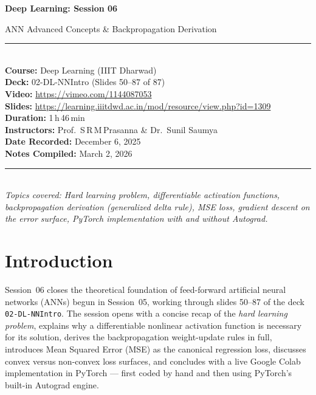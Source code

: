 \documentclass[12pt,a4paper]{article}
\begin{document}
\begin{titlepage}
  \centering
  \vspace*{2cm}
  {\Huge\bfseries Deep Learning: Session 06\par}
  \vspace{0.5cm}
  {\LARGE ANN Advanced Concepts \& Backpropagation Derivation\par}
  \vspace{1.5cm}
  \rule{\linewidth}{0.4pt}\\[0.4cm]
  {\large
    \textbf{Course:} Deep Learning (IIIT Dharwad)\\[0.3cm]
    \textbf{Deck:} 02-DL-NNIntro (Slides 50--87 of 87)\\[0.3cm]
    \textbf{Video:} \url{https://vimeo.com/1144087053}\\[0.3cm]
    \textbf{Slides:} \url{https://learning.iiitdwd.ac.in/mod/resource/view.php?id=1309}\\[0.3cm]
    \textbf{Duration:} 1\,h\,46\,min\\[0.3cm]
    \textbf{Instructors:} Prof.\ S\,R\,M\,Prasanna \& Dr.\ Sunil Saumya\\[0.3cm]
    \textbf{Date Recorded:} December 6, 2025\\[0.3cm]
    \textbf{Notes Compiled:} March 2, 2026
  }\\[1.0cm]
  \rule{\linewidth}{0.4pt}\\[1.5cm]
  {\large\itshape
    Topics covered: Hard learning problem, differentiable activation functions,
    backpropagation derivation (generalized delta rule), MSE loss, gradient
    descent on the error surface, PyTorch implementation with and without
    Autograd.
  }
  \vfill
\end{titlepage}


\newpage

\section{Introduction}
\label{sec:intro}

Session~06 closes the theoretical foundation of feed-forward artificial neural
networks (ANNs) begun in Session~05, working through slides 50--87 of the deck
\texttt{02-DL-NNIntro}.  The session opens with a concise recap of the
\emph{hard learning problem}, explains why a differentiable nonlinear activation
function is necessary for its solution, derives the backpropagation weight-update
rules in full, introduces Mean Squared Error (MSE) as the canonical regression
loss, discusses convex versus non-convex loss surfaces, and concludes with a
live Google Colab implementation in PyTorch --- first coded by hand and then
using PyTorch's built-in Autograd engine.
\end{document}
